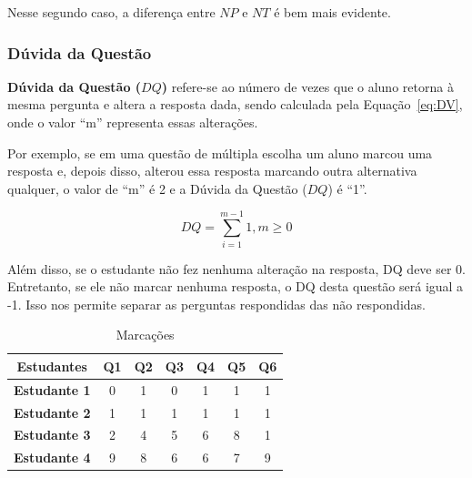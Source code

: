 Nesse segundo caso, a diferença entre $NP$ e $NT$ é bem mais evidente.


%
%
%

\subsubsection{Dúvida da Questão}\label{sec:duvida-questao}

\textbf{Dúvida da Questão ($DQ$)} refere-se ao número de vezes que o aluno retorna à mesma pergunta e altera a resposta dada, sendo calculada pela Equação~\ref{eq:DV}, onde o valor ``m'' representa essas alterações.

Por exemplo, se em uma questão de múltipla escolha um aluno marcou uma resposta e, depois disso, alterou essa resposta marcando outra alternativa qualquer, o valor de ``m'' é 2 e a Dúvida da Questão ($DQ$) é ``1''.

\begin{equation}
\label{eq:DV}
DQ = \sum_{i=1}^{m-1} 1, m\geq0
\end{equation}

Além disso, se o estudante não fez nenhuma alteração na resposta, DQ deve ser 0. Entretanto, se ele não marcar nenhuma resposta, o DQ desta questão será igual a -1. Isso nos permite separar as perguntas respondidas das não respondidas.

\begin{table}[htbp]
\caption{Marcações}
\begin{center}
\begin{tabular}{|c|c|c|c|c|c|c|}
\hline
\textbf{Estudantes} & \textbf{Q1} & \textbf{Q2} & \textbf{Q3} & \textbf{Q4} & \textbf{Q5} & \textbf{Q6} \\ \hline
\textbf{Estudante 1} & 0 & 1 & 0 & 1 & 1 & 1 \\ \hline
\textbf{Estudante 2} & 1 & 1 & 1 & 1 & 1 & 1 \\ \hline
\textbf{Estudante 3} & 2 & 4 & 5 & 6 & 8 & 1 \\ \hline
\textbf{Estudante 4} & 9 & 8 & 6 & 6 & 7 & 9 \\ \hline
\end{tabular}
\end{center}
\label{tab:marcacoes}
\end{table}

